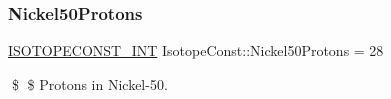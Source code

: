 \subsubsection{\texorpdfstring{Nickel50\+Protons}{Nickel50Protons}}
{\footnotesize\ttfamily \mbox{\hyperlink{group___isotope_const-_macros_ga5f18360b3e99483a35c32d789e62621c}{I\+S\+O\+T\+O\+P\+E\+C\+O\+N\+S\+T\+\_\+\+I\+NT}} Isotope\+Const\+::\+Nickel50\+Protons = 28}

\$ \$ Protons in Nickel-\/50. 